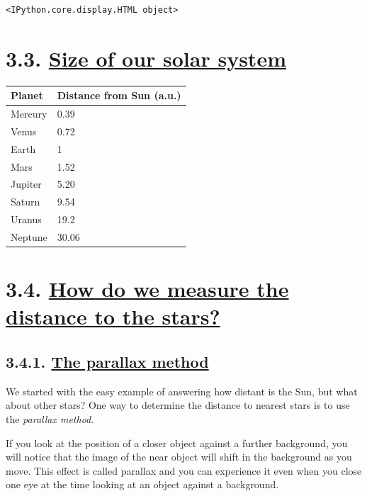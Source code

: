 \documentclass[
  letterpaper,
  DIV=11,
  numbers=noendperiod]{scrreprt}
\begin{document}
\begin{verbatim}
<IPython.core.display.HTML object>
\end{verbatim}

\hypertarget{size-of-our-solar-system}{%
\section{\texorpdfstring{3.3. \protect\hyperlink{toc0_}{Size of our
solar
system}}{3.3. Size of our solar system}}\label{size-of-our-solar-system}}

\begin{longtable}[]{@{}ll@{}}
\toprule\noalign{}
Planet & Distance from Sun (a.u.) \\
\midrule\noalign{}
\endhead
\bottomrule\noalign{}
\endlastfoot
Mercury & 0.39 \\
Venus & 0.72 \\
Earth & 1 \\
Mars & 1.52 \\
Jupiter & 5.20 \\
Saturn & 9.54 \\
Uranus & 19.2 \\
Neptune & 30.06 \\
\end{longtable}

\hypertarget{how-do-we-measure-the-distance-to-the-stars}{%
\section{\texorpdfstring{3.4. \protect\hyperlink{toc0_}{How do we
measure the distance to the
stars?}}{3.4. How do we measure the distance to the stars?}}\label{how-do-we-measure-the-distance-to-the-stars}}

\hypertarget{the-parallax-method}{%
\subsection{\texorpdfstring{3.4.1. \protect\hyperlink{toc0_}{The
parallax
method}}{3.4.1. The parallax method}}\label{the-parallax-method}}

We started with the easy example of answering how distant is the Sun,
but what about other stars? One way to determine the distance to nearest
stars is to use the \emph{parallax method}.

If you look at the position of a closer object against a further
background, you will notice that the image of the near object will shift
in the background as you move. This effect is called parallax and you
can experience it even when you close one eye at the time looking at an
object against a background.
\end{document}
